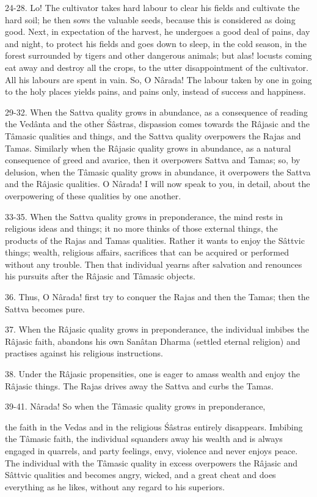 24-28. Lo! The cultivator takes hard labour to clear his fields and cultivate the hard soil; he then sows the valuable seeds, because this is considered as doing good. Next, in expectation of the harvest, he undergoes a good deal of pains, day and night, to protect his fields and goes down to sleep, in the cold season, in the forest surrounded by tigers and other dangerous animals; but alas! locusts coming eat away and destroy all the crops, to the utter disappointment of the cultivator. All his labours are spent in vain. So, O N\^arada! The labour taken by one in going to the holy places yields pains, and pains only, instead of success and happiness.

29-32. When the Sattva quality grows in abundance, as a consequence of reading the Ved\^anta and the other \'S\^astras, dispassion comes towards the R\^ajasic and the T\^amasic qualities and things, and the Sattva quality overpowers the Rajas and Tamas. Similarly when the R\^ajasic quality grows in abundance, as a natural consequence of greed and avarice, then it overpowers Sattva and Tamas; so, by delusion, when the T\^amasic quality grows in abundance, it overpowers the Sattva and the R\^ajasic qualities. O N\^arada! I will now speak to you, in detail, about the overpowering of these qualities by one another.

33-35. When the Sattva quality grows in preponderance, the mind rests in religious ideas and things; it no more thinks of those external things, the products of the Rajas and Tamas qualities. Rather it wants to enjoy the S\^attvic things; wealth, religious affairs, sacrifices that can be acquired or performed without any trouble. Then that individual yearns after salvation and renounces his pursuits after the R\^ajasic and T\^amasic objects.

36. Thus, O N\^arada! first try to conquer the Rajas and then the Tamas; then the Sattva becomes pure.

37. When the R\^ajasic quality grows in preponderance, the individual imbibes the R\^ajasic faith, abandons his own San\^atan Dharma (settled eternal religion) and practises against his religious instructions.

38. Under the R\^ajasic propensities, one is eager to amass wealth and enjoy the R\^ajasic things. The Rajas drives away the Sattva and curbs the Tamas.

39-41. N\^arada! So when the T\^amasic quality grows in preponderance,

the faith in the Vedas and in the religious \'S\^astras entirely disappears. Imbibing the T\^amasic faith, the individual squanders away his wealth and is always engaged in quarrels, and party feelings, envy, violence and never enjoys peace. The individual with the T\^amasic quality in excess overpowers the R\^ajasic and S\^attvic qualities and becomes angry, wicked, and a great cheat and does everything as he likes, without any regard to his superiors.

